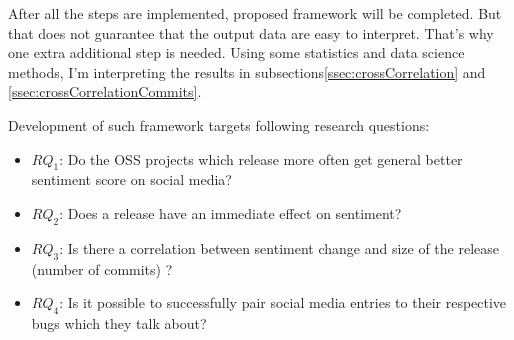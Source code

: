 After all the steps are implemented, proposed framework will be completed. But that does not guarantee that the output data are easy to interpret. That's why one extra additional step is needed. Using some statistics and data science methods, I'm interpreting the results in subsections\ref{ssec:crossCorrelation} and \ref{ssec:crossCorrelationCommits}.

Development of such framework targets following research questions:
\begin{itemize}
\item{\textbf{$RQ_{1}$}: Do the OSS projects which release more often get general better sentiment score on social media?}
\item{\textbf{$RQ_{2}$}: Does a release have an immediate effect on sentiment?}
\item{\textbf{$RQ_{3}$}: Is there a correlation between sentiment change and size of the release (number of commits) ?}
\item{\textbf{$RQ_{4}$}: Is it possible to successfully pair social media entries to their respective bugs which they talk about?}
\end{itemize}